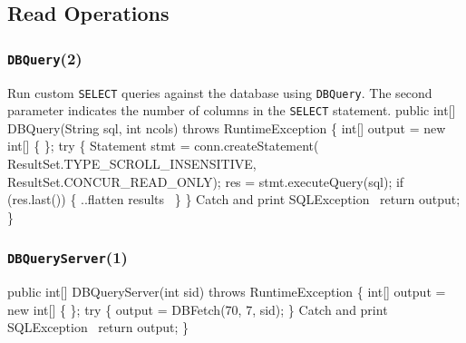 \documentclass{article}
\def\nwendcode{\endtrivlist \endgroup}
\let\nwdocspar=\par
\theoremstyle{definition}
\begin{document}
\subsection{Read Operations}
\label{sec:read-operations}
\subsubsection{{\tt{}DBQuery}(2)}
Run custom {\tt{}SELECT} queries against the database using
{\tt{}DBQuery}. The second parameter indicates the number of columns in the
{\tt{}SELECT} statement.
\nwenddocs{}\endmoddef{}
public int[] DBQuery(String sql, int ncols) throws RuntimeException \{
  int[] output = new int[] \{ \};
  try \{
    Statement stmt = conn.createStatement(
      ResultSet.TYPE_SCROLL_INSENSITIVE, ResultSet.CONCUR_READ_ONLY);
    res = stmt.executeQuery(sql);
    if (res.last()) \{
      \LA{}..flatten results~{\nwtagstyle{}}\RA{}
    \}
  \}
  \LA{}Catch and print \code{}SQLException\edoc{}~{\nwtagstyle{}}\RA{}
  return output;
\}
\nwendcode{}%

\subsubsection{{\tt{}\protect{}\protect{}DBQueryServer}(1)}
\nwenddocs{}\endmoddef{}
public int[] DBQueryServer(int sid) throws RuntimeException \{
  int[] output = new int[] \{ \};
  try \{
    output = DBFetch(70, 7, sid);
  \}
  \LA{}Catch and print \code{}SQLException\edoc{}~{\nwtagstyle{}}\RA{}
  return output;
\}
\eatline
{}\nwendcode{}\nwdocspar
\end{document}
